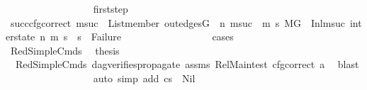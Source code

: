 \begin{isabellebody}
\isanewline
\ \ \ \ \ \ \ \ \ \ \ \ \ \ \ \ \isamarkupfalse%
\ first{\isacharunderscore}{\kern0pt}step\ \isanewline
\ \ \ \ \ \ \ \ \ \ \ \ \ \ \ \ \isamarkupfalse%
\ succ{\isacharunderscore}{\kern0pt}cfg{\isacharunderscore}{\kern0pt}correct{\isacharcolon}{\kern0pt}\ {\isachardoublequoteopen}{\isacharparenleft}{\kern0pt}{\isasymforall}msuc{}{\isachardot}{\kern0pt}\ \ List{\isachardot}{\kern0pt}member\ {\isacharparenleft}{\kern0pt}out{\isacharunderscore}{\kern0pt}edges{\isacharparenleft}{\kern0pt}G{\isacharparenright}{\kern0pt}\ {\isacharbang}{\kern0pt}\ n{\isacharparenright}{\kern0pt}\ msuc{}\ {\isasymlongrightarrow}\ {\isacharparenleft}{\kern0pt}{\isasymforall}m{}\ s{}{\isachardot}{\kern0pt}\ {\isacharparenleft}{\kern0pt}{\isacharparenleft}{\kern0pt}M{\isacharcomma}{\kern0pt}{\isasymLambda}{\isacharcomma}{\kern0pt}{\isasymGamma}{\isacharcomma}{\kern0pt}{\isasymOmega}{\isacharcomma}{\kern0pt}G\ {\isasymturnstile}\ {\isacharparenleft}{\kern0pt}Inl{\isacharparenleft}{\kern0pt}msuc{}{\isacharparenright}{\kern0pt}{\isacharcomma}{\kern0pt}\ inter{\isacharunderscore}{\kern0pt}state{\isacharparenright}{\kern0pt}\ {\isacharminus}{\kern0pt}n{\isasymrightarrow}{\isacharasterisk}{\kern0pt}\ {\isacharparenleft}{\kern0pt}m{}{\isacharcomma}{\kern0pt}\ s{}{\isacharparenright}{\kern0pt}{\isacharparenright}{\kern0pt}\ {\isasymlongrightarrow}\ s{}\ {\isasymnoteq}\ Failure{\isacharparenright}{\kern0pt}{\isacharparenright}{\kern0pt}{\isacharparenright}{\kern0pt}{\isachardoublequoteclose}\isanewline
\ \ \ \ \ \ \ \ \ \ \ \ \ \ \ \ \isamarkupfalse%
\ cases\isanewline
\ \ \ \ \ \ \ \ \ \ \ \ \ \ \ \ \ \ \isamarkupfalse%
\ RedSimpleCmds\ \isamarkupfalse%
\ {\isacharquery}{\kern0pt}thesis\ \isamarkupfalse%
\ {}\ RedSimpleCmds{\isacharparenleft}{\kern0pt}{}{\isacharparenright}{\kern0pt}\ dag{\isacharunderscore}{\kern0pt}verifies{\isacharunderscore}{\kern0pt}propagate\ assms{\isacharparenleft}{\kern0pt}{}{\isacharminus}{\kern0pt}{}{\isacharparenright}{\kern0pt}\ Rel{\isacharunderscore}{\kern0pt}Main{\isacharunderscore}{\kern0pt}test{\isacharparenleft}{\kern0pt}{}{\isacharparenright}{\kern0pt}\ cfg{\isacharunderscore}{\kern0pt}correct\ a{}\ \isamarkupfalse%
\ blast\isanewline
\ \ \ \ \ \ \ \ \ \ \ \ \ \ \ \ \isamarkupfalse%
\ {\isacharparenleft}{\kern0pt}auto\ simp\ add{\isacharcolon}{\kern0pt}\ {\isacartoucheopen}cs{}\ {\isasymnoteq}\ Nil{\isacartoucheclose}{\isacharparenright}{\kern0pt}\isanewline

\end{isabellebody}
